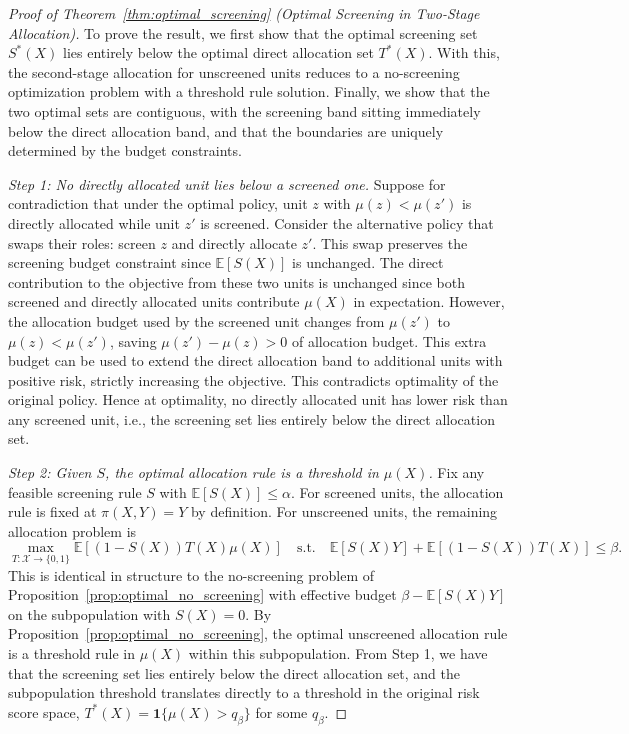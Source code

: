 \begin{proof}[Proof of Theorem~\ref{thm:optimal_screening} (Optimal Screening in Two-Stage Allocation)]

To prove the result, we first show that the optimal screening set $S^*(X)$ lies entirely below the optimal direct allocation set $T^*(X)$. With this, the second-stage allocation for unscreened units reduces to a no-screening optimization problem with a threshold rule solution. Finally, we show that the two optimal sets are contiguous, with the screening band sitting immediately below the direct allocation band, and that the boundaries are uniquely determined by the budget constraints.


\textit{Step 1: No directly allocated unit lies below a screened one.} Suppose for contradiction that under the optimal policy, unit $z$ with $\mu(z) < \mu(z')$ is directly allocated while unit $z'$ is screened. Consider the alternative policy that swaps their roles: screen $z$ and directly allocate $z'$. This swap preserves the screening budget constraint since $\mathbb{E}[S(X)]$ is unchanged. The direct contribution to the objective from these two units is unchanged since both screened and directly allocated units contribute $\mu(X)$ in expectation. However, the allocation budget used by the screened unit changes from $\mu(z')$ to $\mu(z) < \mu(z')$, saving $\mu(z') - \mu(z) > 0$ of allocation budget. This extra budget can be used to extend the direct allocation band to additional units with positive risk, strictly increasing the objective. This contradicts optimality of the original policy. Hence at optimality, no directly allocated unit has lower risk than any screened unit, i.e., the screening set lies entirely below the direct allocation set.

\textit{Step 2: Given $S$, the optimal allocation rule is a threshold in $\mu(X)$.} Fix any feasible screening rule $S$ with $\mathbb{E}[S(X)] \leq \alpha$. For screened units, the allocation rule is fixed at $\pi(X,Y) = Y$ by definition. For unscreened units, the remaining allocation problem is
\begin{equation}
    \max_{T: \mathcal{X} \to \{0,1\}} \mathbb{E}[(1-S(X))T(X)\mu(X)] \quad \text{s.t.} \quad \mathbb{E}[S(X)Y] + \mathbb{E}[(1-S(X))T(X)] \leq \beta.
\end{equation}
This is identical in structure to the no-screening problem of Proposition~\ref{prop:optimal_no_screening} with effective budget $\beta - \mathbb{E}[S(X)Y]$ on the subpopulation with $S(X) = 0$. By Proposition~\ref{prop:optimal_no_screening}, the optimal unscreened allocation rule is a threshold rule in $\mu(X)$ within this subpopulation. From Step 1, we have that the screening set lies entirely below the direct allocation set, and the subpopulation threshold translates directly to a threshold in the original risk score space, $T^*(X) = \mathbf{1}\{\mu(X) > q_\beta\}$ for some $q_\beta$.


\end{proof}

